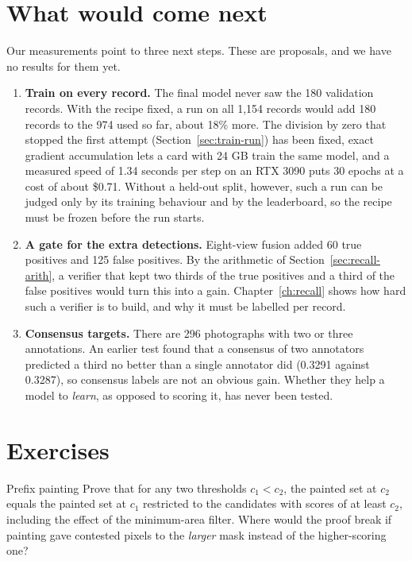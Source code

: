\section{What would come next}\label{sec:sub-next}
Our measurements point to three next steps. These are proposals, and we have no results for them yet.
\begin{enumerate}[leftmargin=*,itemsep=2pt]
\item \textbf{Train on every record.} The final model never saw the 180 validation records. With the
recipe fixed, a run on all 1,154 records would add 180 records to the 974 used so far, about 18\% more.
The division by zero that stopped the first attempt (Section~\ref{sec:train-run}) has been fixed, exact
gradient accumulation lets a card with 24 GB train the same model, and a measured speed of 1.34 seconds
per step on an RTX 3090 puts 30 epochs at a cost of about \$0.71. Without a held-out split, however,
such a run can be judged only by its training behaviour and by the leaderboard, so the recipe must be
frozen before the run starts.
\item \textbf{A gate for the extra detections.} Eight-view fusion added 60 true positives and 125 false
positives. By the arithmetic of Section~\ref{sec:recall-arith}, a verifier that kept two thirds of the
true positives and a third of the false positives would turn this into a gain. Chapter~\ref{ch:recall}
shows how hard such a verifier is to build, and why it must be labelled per record.
\item \textbf{Consensus targets.} There are 296 photographs with two or three annotations. An earlier
test found that a consensus of two annotators predicted a third no better than a single annotator did
(0.3291 against 0.3287), so consensus labels are not an obvious gain. Whether they help a model to
\emph{learn}, as opposed to scoring it, has never been tested.
\end{enumerate}

\section*{Exercises}
\begin{exercise}{Prefix painting}\label{ex:sub-prefix}
Prove that for any two thresholds $c_1 < c_2$, the painted set at $c_2$ equals the painted set at $c_1$
restricted to the candidates with scores of at least $c_2$, including the effect of the minimum-area
filter. Where would the proof break if painting gave contested pixels to the \emph{larger} mask
instead of the higher-scoring one?
\end{exercise}

